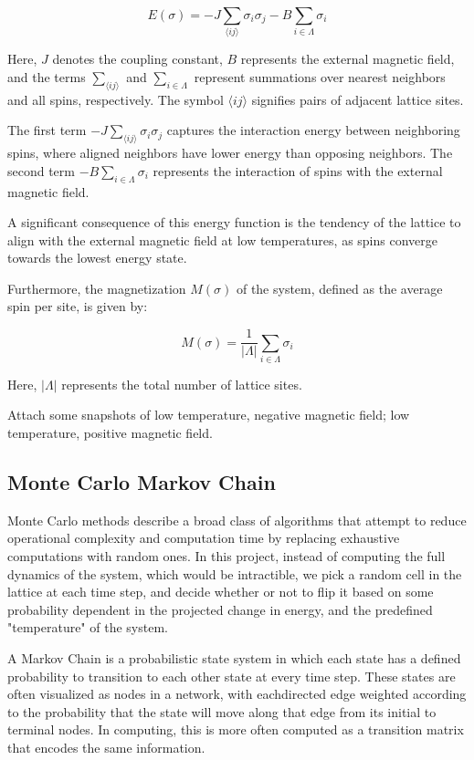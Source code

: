 \documentclass[%
 reprint,
 amsmath,amssymb,
 aps,
]{revtex4-2}
\begin{document}
\begin{equation}
E(\sigma) = -J\sum_{\langle ij \rangle} \sigma_i\sigma_j - B\sum_{i \in \Lambda}\sigma_i
\end{equation}

Here, $J$ denotes the coupling constant, $B$ represents the external magnetic field, and the terms $\sum_{\langle ij \rangle}$ and $\sum_{i \in \Lambda}$ represent summations over nearest neighbors and all spins, respectively. The symbol $\langle ij \rangle$ signifies pairs of adjacent lattice sites.

The first term $-J\sum_{\langle ij \rangle} \sigma_i\sigma_j$ captures the interaction energy between neighboring spins, where aligned neighbors have lower energy than opposing neighbors. The second term $-B\sum_{i \in \Lambda}\sigma_i$ represents the interaction of spins with the external magnetic field.

A significant consequence of this energy function is the tendency of the lattice to align with the external magnetic field at low temperatures, as spins converge towards the lowest energy state.

Furthermore, the magnetization $M(\sigma)$ of the system, defined as the average spin per site, is given by:

\begin{equation}
M(\sigma) = \frac{1}{|\Lambda|} \sum_{i \in \Lambda} \sigma_i
\end{equation}

Here, $|\Lambda|$ represents the total number of lattice sites.

Attach some snapshots of low temperature, negative magnetic field; low temperature, positive magnetic field.

\subsection{\label{sec:level2}Monte Carlo Markov Chain}  

Monte Carlo methods describe a broad class of algorithms that attempt to 
reduce operational complexity and computation time by replacing exhaustive 
computations with random ones. In this project, instead of computing the full dynamics of the system, which would be intractible, we pick a random cell in the lattice at each time step, and decide whether or not to flip it based on some probability dependent in the projected change in energy, and the predefined "temperature" of the system.  
  
A Markov Chain is a probabilistic state system in which each state has a defined probability to transition to each other state at every time step. These states are often visualized as nodes in a network, with eachdirected edge weighted according to the probability that the state will move along that edge from its initial to terminal nodes. In computing, this is more often computed as a transition matrix that encodes the same information.  
  
\end{document}
